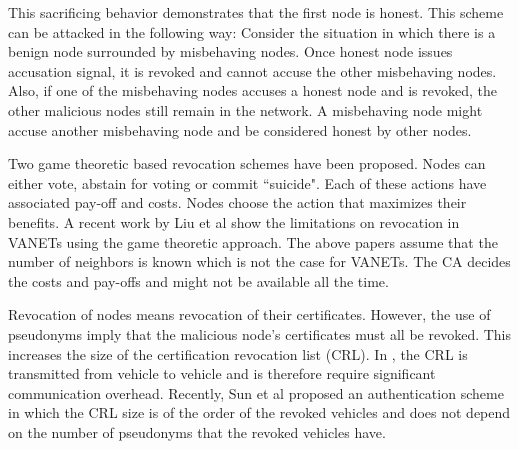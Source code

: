 \documentclass[conference]{IEEEtran}[10pt]
\begin{document}
This sacrificing behavior demonstrates that the first node is honest. 
This scheme can be attacked in the following way:
Consider the situation in which there is a benign node surrounded by misbehaving nodes.  
Once honest node issues accusation signal, it is revoked and
cannot accuse the other misbehaving nodes. 
Also, if one of the misbehaving nodes accuses a honest node and is revoked, the other malicious nodes still remain in the network. 
A misbehaving node might accuse  another misbehaving node and be considered honest by other nodes.
 

Two game theoretic based revocation schemes \cite{RMFH08,BMRH10} have been proposed. 
Nodes can either vote, abstain for voting or commit ``suicide". 
Each of these actions have associated pay-off and costs. Nodes choose the action that maximizes their benefits. 
A recent work by Liu et al \cite{LCH10} show the limitations on revocation in VANETs using the game theoretic approach. 
The above papers assume that the number of neighbors is known which is not the case for VANETs. 
The CA decides the costs and pay-offs and might not be available all the time. 

Revocation of nodes means revocation of their certificates. 
However, the use of pseudonyms imply that the malicious node's certificates must all be revoked. 
This increases the size of the certification revocation list (CRL). In \cite{LHH08,PMH08}, the CRL is
transmitted from vehicle to vehicle and is therefore require significant communication overhead. 
Recently, 
Sun et al \cite{SLLSS10} proposed an  authentication scheme in which the CRL size is of the
order of the revoked vehicles and does not depend on the number of pseudonyms that the revoked vehicles have.   
\end{document}
